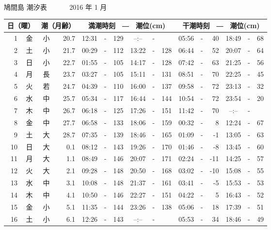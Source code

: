 \documentclass[12pt.a4j]{jsarticle}
\begin{document}
\pagestyle{empty}
 \begin{center}
 {\LARGE 鳩間島  潮汐表　　　}
 {\large 2016 年  1 月}\\
 \begin{table}[ht]
    \begin{tabular}{|rc|cr|ccrccr|ccrccr|}
    \hline
    \multicolumn{2}{|c|}{日（曜）} & \multicolumn{2}{c|}{潮（月齢）} & \multicolumn{6}{c|}{満潮時刻　―　潮位(cm)} & \multicolumn{6}{c|}{干潮時刻　―　潮位(cm)} \\
 \hline
 1 & 金 & 小 & 20.7 &  12:31 &-& 129  &  --:-- &-&     &   05:56 &-&  40  &   18:49 &-&  68  \\
 2 & 土 & 小 & 21.7 &  00:29 &-& 112  &  13:22 &-& 128  &   06:44 &-&  52  &   20:07 &-&  64  \\
 3 & 日 & 小 & 22.7 &  01:55 &-& 105  &  14:17 &-& 128  &   07:42 &-&  63  &   21:25 &-&  56  \\
 4 & 月 & 長 & 23.7 &  03:27 &-& 105  &  15:11 &-& 131  &   08:51 &-&  70  &   22:25 &-&  45  \\
 5 & 火 & 若 & 24.7 &  04:39 &-& 110  &  16:00 &-& 137  &   09:58 &-&  72  &   23:13 &-&  32  \\
 6 & 水 & 中 & 25.7 &  05:34 &-& 117  &  16:44 &-& 144  &   10:54 &-&  72  &   23:54 &-&  20  \\
 7 & 木 & 中 & 26.7 &  06:18 &-& 125  &  17:26 &-& 151  &   11:42 &-&  70  &   --:-- &-&     \\
 8 & 金 & 中 & 27.7 &  06:58 &-& 133  &  18:06 &-& 159  &   00:32 &-&   8  &   12:24 &-&  67  \\
 9 & 土 & 大 & 28.7 &  07:35 &-& 139  &  18:46 &-& 165  &   01:09 &-&  -1  &   13:05 &-&  63  \\
10 & 日 & 大 &  0.1 &  08:12 &-& 143  &  19:26 &-& 170  &   01:46 &-&  -8  &   13:45 &-&  60  \\
11 & 月 & 大 &  1.1 &  08:49 &-& 146  &  20:07 &-& 171  &   02:24 &-& -11  &   14:25 &-&  57  \\
12 & 火 & 大 &  2.1 &  09:28 &-& 148  &  20:50 &-& 168  &   03:02 &-& -10  &   15:08 &-&  55  \\
13 & 水 & 中 &  3.1 &  10:08 &-& 148  &  21:37 &-& 161  &   03:41 &-&  -5  &   15:53 &-&  53  \\
14 & 木 & 中 &  4.1 &  10:50 &-& 146  &  22:27 &-& 151  &   04:22 &-&   5  &   16:43 &-&  52  \\
15 & 金 & 小 &  5.1 &  11:35 &-& 144  &  23:26 &-& 138  &   05:06 &-&  18  &   17:39 &-&  51  \\
16 & 土 & 小 &  6.1 &  12:26 &-& 143  &  --:-- &-&     &   05:53 &-&  34  &   18:46 &-&  49  \\

\end{tabular}
\end{table}
\end{center}
\end{document}
